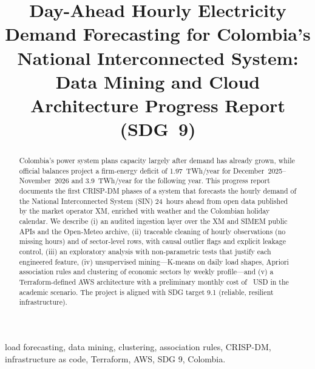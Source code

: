 \documentclass[conference,10pt]{IEEEtran}
\begin{document}
\title{Day-Ahead Hourly Electricity Demand Forecasting for Colombia's National Interconnected System: Data Mining and Cloud Architecture Progress Report (SDG~9)}

\author{
}

\maketitle

\begin{abstract}
Colombia's power system plans capacity largely after demand has already grown, while official balances project a firm-energy deficit of 1.97~TWh/year for December~2025--November~2026 and 3.9~TWh/year for the following year. This progress report documents the first CRISP-DM phases of a system that forecasts the hourly demand of the National Interconnected System (SIN) 24~hours ahead from open data published by the market operator XM, enriched with weather and the Colombian holiday calendar. We describe (i) an audited ingestion layer over the XM and SIMEM public APIs and the Open-Meteo archive, (ii) traceable cleaning of \panelFilas{} hourly observations (no missing hours) and of \ciiuFilas{} sector-level rows, with causal outlier flags and explicit leakage control, (iii) an exploratory analysis with non-parametric tests that justify each engineered feature, (iv) unsupervised mining---K-means on daily load shapes, Apriori association rules and clustering of economic sectors by weekly profile---and (v) a Terraform-defined AWS architecture with a preliminary monthly cost of \costoAcademicoUsd~USD in the academic scenario. The project is aligned with SDG target 9.1 (reliable, resilient infrastructure).
\end{abstract}

\begin{IEEEkeywords}
load forecasting, data mining, clustering, association rules, CRISP-DM, infrastructure as code, Terraform, AWS, SDG 9, Colombia.
\end{IEEEkeywords}
\end{document}
